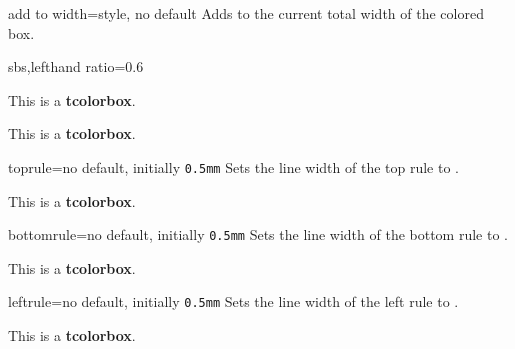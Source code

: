 \begin{docTcbKey}[][doc new=2014-11-07]{add to width}{=}{style, no default}
  Adds  to the current total width of the colored box.
\begin{dispExample*}{sbs,lefthand ratio=0.6}

\begin{tcolorbox}
This is a \textbf{tcolorbox}.
\end{tcolorbox}

\begin{tcolorbox}[add to width=1cm]
This is a \textbf{tcolorbox}.
\end{tcolorbox}
\end{dispExample*}
\end{docTcbKey}


\clearpage
\begin{docTcbKey}{toprule}{=}{no default, initially \texttt{0.5mm}}
  Sets the line width of the top rule to .
\begin{dispExample}

\begin{tcolorbox}[toprule=3mm]
This is a \textbf{tcolorbox}.
\end{tcolorbox}
\end{dispExample}
\end{docTcbKey}


\begin{docTcbKey}{bottomrule}{=}{no default, initially \texttt{0.5mm}}
  Sets the line width of the bottom rule to .
\begin{dispExample}

\begin{tcolorbox}[bottomrule=3mm]
This is a \textbf{tcolorbox}.
\end{tcolorbox}
\end{dispExample}
\end{docTcbKey}

\begin{docTcbKey}{leftrule}{=}{no default, initially \texttt{0.5mm}}
  Sets the line width of the left rule to .
\begin{dispExample}

\begin{tcolorbox}[leftrule=3mm]
This is a \textbf{tcolorbox}.
\end{tcolorbox}
\end{dispExample}
\end{docTcbKey}


